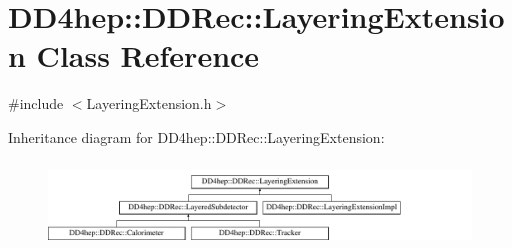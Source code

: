\hypertarget{class_d_d4hep_1_1_d_d_rec_1_1_layering_extension}{}\section{D\+D4hep\+:\+:D\+D\+Rec\+:\+:Layering\+Extension Class Reference}
\label{class_d_d4hep_1_1_d_d_rec_1_1_layering_extension}


{\ttfamily \#include $<$Layering\+Extension.\+h$>$}

Inheritance diagram for D\+D4hep\+:\+:D\+D\+Rec\+:\+:Layering\+Extension\+:\begin{figure}[H]
\begin{center}
\leavevmode
\includegraphics[height=2.295082cm]{class_d_d4hep_1_1_d_d_rec_1_1_layering_extension}
\end{center}
\end{figure}
